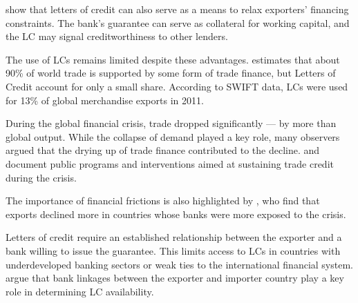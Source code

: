 \documentclass[11pt]{article}
\begin{document}
\citep{Niepmann2013} show that letters of credit can also serve as a means to relax exporters’ financing constraints. The bank's guarantee can serve as collateral for working capital, and the LC may signal creditworthiness to other lenders.

The use of LCs remains limited despite these advantages. \citep{Auboin2009} estimates that about 90\% of world trade is supported by some form of trade finance, but Letters of Credit account for only a small share. According to SWIFT data, LCs were used for 13\% of global merchandise exports in 2011.

  \item During the global financial crisis, trade dropped significantly — by more than global output. While the collapse of demand played a key role, many observers argued that the drying up of trade finance contributed to the decline. \citep{AuboinEngemann2014} and \citep{Asmundson2011} document public programs and interventions aimed at sustaining trade credit during the crisis.

    \item The importance of financial frictions is also highlighted by \citep{ChorManova2012}, who find that exports declined more in countries whose banks were more exposed to the crisis.

    \item Letters of credit require an established relationship between the exporter and a bank willing to issue the guarantee. This limits access to LCs in countries with underdeveloped banking sectors or weak ties to the international financial system. \citet{Niepmann2017} argue that bank linkages between the exporter and importer country play a key role in determining LC availability.
\end{document}
